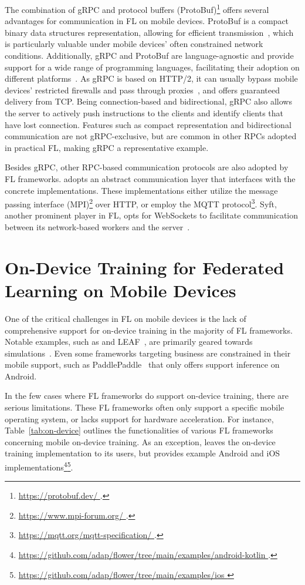 \documentclass[conference]{IEEEtran}
\begin{document}
The combination of gRPC and protocol buffers (ProtoBuf)\footnote{\url{
    https://protobuf.dev/
}.} offers several advantages for communication in FL on mobile devices.
ProtoBuf is a compact binary data structures representation,
allowing for efficient transmission~\cite{popic2016performance},
which is particularly valuable under mobile devices'
often constrained network conditions.
Additionally,
gRPC and ProtoBuf are language-agnostic and
provide support for a wide range of programming languages,
facilitating their adoption on different platforms~\cite{araujo2020performance}.
As gRPC is based on HTTP/2,
it can usually bypass mobile devices' restricted firewalls and
pass through proxies~\cite{araujo2020performance},
and offers guaranteed delivery from TCP.
Being connection-based and bidirectional,
gRPC also allows the server to actively push instructions to the clients and
identify clients that have lost connection.
Features such as compact representation and bidirectional communication are
not gRPC-exclusive,
but are common in other RPCs adopted in practical FL,
making gRPC a representative example.

Besides gRPC, other RPC-based communication protocols are
also adopted by FL frameworks.
\FedML{} adopts an abstract communication layer that interfaces with
the concrete implementations.
These implementations either utilize the message passing interface
(MPI)\footnote{\url{
    https://www.mpi-forum.org/
}.} over HTTP,
or employ the MQTT protocol\footnote{\url{
    https://mqtt.org/mqtt-specification/
}.}.
Syft, another prominent player in FL,
opts for WebSockets to facilitate communication between
its network-based workers and the server~\cite{Ziller2021}.

\section{On-Device Training for Federated Learning on Mobile Devices}

\label{sec:on-device}

One of the critical challenges in FL on mobile devices is
the lack of comprehensive support for on-device training in
the majority of FL frameworks.
Notable examples, such as
\TFF{} and LEAF~\cite{caldas2018leaf},
are primarily geared towards simulations~\cite{kholod2020open}.
Even some frameworks targeting business are constrained in their mobile support,
such as PaddlePaddle~\cite{ma2019paddlepaddle} that
only offers support inference on Android.

In the few cases where FL frameworks do support on-device training,
there are serious limitations.
These FL frameworks often only support a specific mobile operating system,
or lacks support for hardware acceleration.
For instance, Table~\ref{tab:on-device} outlines the functionalities of
various FL frameworks concerning mobile on-device training.
As an exception,
\Flower{} leaves the on-device training implementation to
its users,
but provides example Android and iOS implementations\footnote{\url{
    https://github.com/adap/flower/tree/main/examples/android-kotlin
}.}\footnote{\url{
    https://github.com/adap/flower/tree/main/examples/ios
}}.
\end{document}
